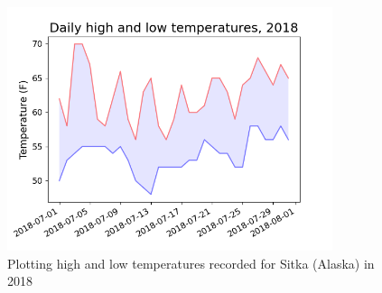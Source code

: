 \documentclass[10pt]{book}
\begin{document}
\begin{figure}[!ht]
\centering
\includegraphics[width=0.85\textwidth]{output/images/High_Low_temp.png}
\caption{\label{fig:orga9bff63}Plotting high and low temperatures recorded for Sitka (Alaska) in 2018}
\end{figure}
\end{document}

